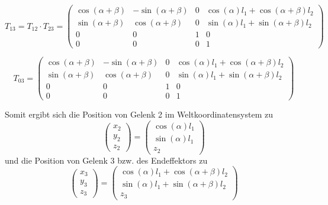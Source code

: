 \documentclass{MSM_latex}
\begin{document}
\begin{equation*}
	T_{13} = T_{12} \cdot T_{23} = \begin{pmatrix}
	\cos(\alpha + \beta) & -\sin(\alpha + \beta) & 0 & \cos(\alpha) l_1 + \cos(\alpha + \beta) l_2\\
	\sin(\alpha + \beta) & \cos(\alpha + \beta) & 0 & \sin(\alpha) l_1 + \sin(\alpha + \beta) l_2 \\
	0 & 0 & 1 & 0 \\
	0 & 0 & 0 & 1
	\end{pmatrix}
\end{equation*}

\begin{equation*}
	T_{03} = \begin{pmatrix}
	\cos(\alpha + \beta) & -\sin(\alpha + \beta) & 0 & \cos(\alpha) l_1 + \cos(\alpha + \beta) l_2\\
	\sin(\alpha + \beta) & \cos(\alpha + \beta) & 0 & \sin(\alpha) l_1 + \sin(\alpha + \beta) l_2 \\
	0 & 0 & 1 & 0 \\
	0 & 0 & 0 & 1
	\end{pmatrix}
\end{equation*}

Somit ergibt sich die Position von Gelenk 2 im Weltkoordinatensystem zu
\begin{equation*}
	\begin{pmatrix} x_2 \\ y_2 \\ z_2 \end{pmatrix} = \begin{pmatrix}
	\cos(\alpha) l_1\\ \sin(\alpha) l_1 \\ z_2 \end{pmatrix}
\end{equation*}
und die Position von Gelenk 3 bzw. des Endeffektors zu
\begin{equation*}
	\begin{pmatrix} x_3 \\ y_3 \\ z_3 \end{pmatrix} = 
	\begin{pmatrix}
	\cos(\alpha) l_1 + \cos(\alpha + \beta) l_2\\ \sin(\alpha) l_1 + \sin(\alpha + \beta) l_2 \\ z_3 
	\end{pmatrix}
\end{equation*}
\end{document}
